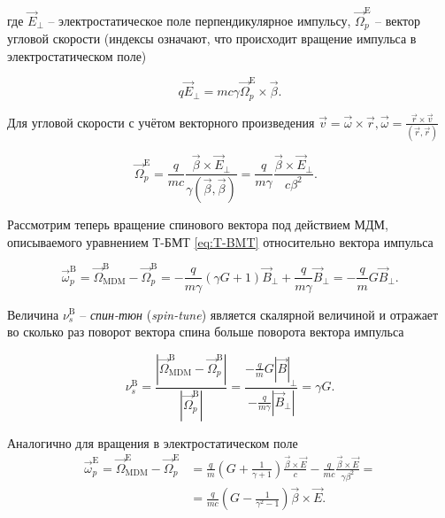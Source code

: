 \noindent где ${\vec{E}}_\bot$ – электростатическое поле перпендикулярное импульсу, ${\vec{\Omega}}_p^{\textrm{E}}$ – вектор угловой скорости (индексы означают, что происходит вращение импульса в электростатическом поле)

\begin{equation}
q{\vec{E}}_\bot=mc\gamma{\vec{\Omega}}_p^{\textrm{E}}\times\vec{\beta}.
\end{equation} 

\noindent Для угловой скорости с учётом векторного произведения $\vec{v}=\vec{\omega}\times\vec{r}, \vec{\omega}=\frac{\vec{r}\times\vec{v}}{(\vec{r},\vec{r})}$

\begin{equation}
{\vec{\Omega}}_p^{\textrm{E}}=\frac{q}{mc}\frac{\vec{\beta}\times{\vec{E}}_\bot}{\gamma(\vec{\beta},\vec{\beta})}=\frac{q}{m\gamma}\frac{\vec{\beta}\times{\vec{E}}_\bot}{c\beta^2}.\ \ \ 
\label{eq:orbital_E}
\end{equation}

\par Рассмотрим теперь вращение спинового вектора под действием МДМ, описываемого уравнением Т-БМТ \ref{eq:T-BMT} относительно вектора импульса

\begin{equation}
{\vec{\omega}}_p^{\textrm{B}}={\vec{\Omega}}_{\textrm{MDM}}^\textrm{B}-{\vec{\Omega}}_p^{\textrm{B}}=-\frac{q}{m\gamma}\left(\gamma G+1\right){\vec{B}}_\bot+\frac{q}{m\gamma}{\vec{B}}_\bot=-\frac{q}{m}{G\vec{B}}_\bot.
\end{equation}

\noindent Величина $\nu_s^{\textrm{B}}$ -- \textit{спин-тюн} (\textit{spin-tune}) является скалярной величиной и отражает во сколько раз поворот вектора спина больше поворота вектора импульса

\begin{equation} 
\nu_s^{\textrm{B}}=\frac{\left|{\vec{\Omega}}_{\textrm{MDM}}^{\textrm{B}}-{\vec{\Omega}}_p^{\textrm{B}}\right|}{\left|{\vec{\Omega}}_p^{\textrm{B}}\right|}=\frac{-\frac{q}{m}{G\left|\vec{B}\right|}_\bot}{-\frac{q}{m\gamma}\left|{\vec{B}}_\bot\right|}=\gamma G.
\label{eq:spintune_B}
\end{equation}

\noindent Аналогично для вращения в электростатическом поле
\begin{equation}
\begin{aligned}
{\vec{\omega}}_p^{\textrm{E}}={\vec{\Omega}}_{\textrm{MDM}}^{\textrm{E}}-{\vec{\Omega}}_p^{\textrm{E}}&=\frac{q}{m}\left(G+\frac{1}{\gamma+1}\right)\frac{\vec{\beta}\times\vec{E}}{c}-\frac{q}{mc}\frac{\vec{\beta}\times\vec{E}}{\gamma\beta^2} =\\
&=\frac{q}{mc}\left(G-\frac{1}{\gamma^2-1}\right)\vec{\beta}\times\vec{E}.
\end{aligned}
\end{equation}

